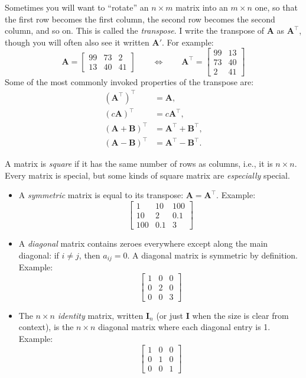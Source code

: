 \documentclass[
  12pt,
  oneside,openany]{book}
\begin{document}
Sometimes you will want to ``rotate'' an \(n \times m\) matrix into an \(m \times n\) one, so that the first row becomes the first column, the second row becomes the second column, and so on. This is called the \emph{transpose}. I write the transpose of \(\mathbf{A}\) as \(\mathbf{A}^\top\), though you will often also see it written \(\mathbf{A}'\). For example:
\[
\mathbf{A}
=
\begin{bmatrix}
  99 & 73 & 2 \\
  13 & 40 & 41
\end{bmatrix}
\qquad
\Leftrightarrow
\qquad
\mathbf{A}^\top =
\begin{bmatrix}
  99 & 13 \\
  73 & 40 \\
  2 & 41
\end{bmatrix}
\]
Some of the most commonly invoked properties of the transpose are:
\[
\begin{aligned}
(\mathbf{A}^\top)^\top &= \mathbf{A}, \\
(c \mathbf{A})^\top &= c \mathbf{A}^\top, \\
(\mathbf{A} + \mathbf{B})^\top &= \mathbf{A}^\top + \mathbf{B}^\top, \\
(\mathbf{A} - \mathbf{B})^\top &= \mathbf{A}^\top - \mathbf{B}^\top.
\end{aligned}
\]

A matrix is \emph{square} if it has the same number of rows as columns, i.e., it is \(n \times n\). Every matrix is special, but some kinds of square matrix are \emph{especially} special.

\begin{itemize}
\item
  A \emph{symmetric} matrix is equal to its transpose: \(\mathbf{A} = \mathbf{A}^\top\). Example: \[
  \begin{bmatrix}
    1 & 10 & 100 \\
    10 & 2 & 0.1 \\
    100 & 0.1 & 3
  \end{bmatrix}\]
\item
  A \emph{diagonal} matrix contains zeroes everywhere except along the main diagonal: if \(i \neq j\), then \(a_{ij} = 0\). A diagonal matrix is symmetric by definition. Example: \[
  \begin{bmatrix}
    1 & 0 & 0 \\
    0 & 2 & 0 \\
    0 & 0 & 3
  \end{bmatrix}\]
\item
  The \(n \times n\) \emph{identity} matrix, written \(\mathbf{I}_n\) (or just \(\mathbf{I}\) when the size is clear from context), is the \(n \times n\) diagonal matrix where each diagonal entry is 1. Example: \[
  \begin{bmatrix}
    1 & 0 & 0 \\
    0 & 1 & 0 \\
    0 & 0 & 1
  \end{bmatrix}\]
\end{itemize}
\end{document}

